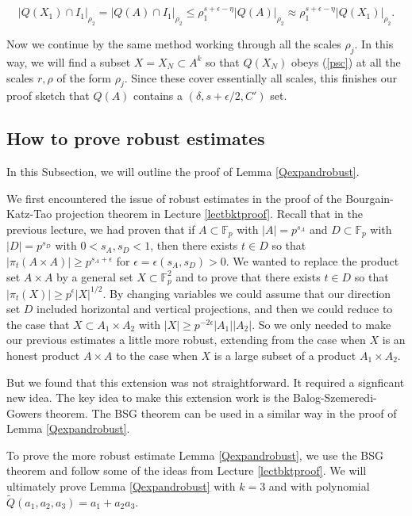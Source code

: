 \documentclass[12pt]{amsart}
\newcommand{\FF}{\mathbb{F}}
\begin{document}
 $$ |Q(X_1) \cap I_1 |_{\rho_2} = |Q(A) \cap I_1|_{\rho_2} \le \rho_1^{s + \epsilon - \eta} |Q(A)|_{\rho_2} \approx \rho_1^{s + \epsilon - \eta} |Q(X_1)|_{\rho_2}. $$

Now we continue by the same method working through all the scales $\rho_j$.   In this way,  we will find a subset $X= X_N \subset A^k$ so that $Q(X_N)$ obeys (\ref{psc}) at all the scales $r, \rho$ of the form $\rho_j$.   Since these cover essentially all scales,  this finishes our proof sketch that $Q(A)$ contains a $(\delta,  s + \epsilon/2, C')$ set.


\subsection{How to prove robust estimates} \label{subsecproverob}

In this Subsection,  we will outline the proof of Lemma \ref{Qexpandrobust}.  

We first encountered the issue of robust estimates in the proof of the Bourgain-Katz-Tao projection theorem in Lecture \ref{lectbktproof}.   Recall that in the previous lecture,  we had proven that if $A \subset \FF_p$ with $|A|  = p^{s_A}$ and $D \subset \FF_p$ with $|D| = p^{s_D}$ with $0 < s_A, s_D < 1$,  then there exists $t \in D$ so that $| \pi_t(A \times A) | \ge p^{s_A + \epsilon}$ for $\epsilon = \epsilon(s_A, s_D) > 0$.   We wanted to replace the product set $A \times A$ by a general set $X \subset \FF_p^2$ and to prove that there exists $t \in D$ so that $| \pi_t (X) | \ge p^\epsilon |X|^{1/2}$.   By changing variables we could assume that our direction set $D$ included horizontal and vertical projections,  and then we could reduce to the case that $X \subset A_1 \times A_2$ with $|X| \ge p^{- 2 \epsilon} |A_1| |A_2|$.   So we only needed to make our previous estimates a little more robust, extending from the case when $X$ is an honest product $A \times A$ to the case when $X$ is a large subset of a product $A_1 \times A_2$.   

But we found that this extension was not straightforward.   It required a signficant new idea.  
The key idea to make this extension work is the Balog-Szemeredi-Gowers theorem.   The BSG theorem can be used in a similar way in the proof of Lemma \ref{Qexpandrobust}.  

To prove the more robust estimate Lemma \ref{Qexpandrobust},  we use the BSG theorem and follow some of the ideas from Lecture \ref{lectbktproof}.
We will ultimately prove Lemma \ref{Qexpandrobust} with $k=3$ and with polynomial $\tilde Q(a_1, a_2, a_3) = a_1 + a_2 a_3$.
\end{document}
